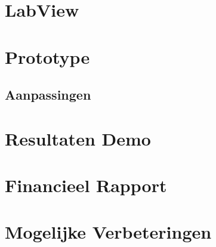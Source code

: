 \documentclass[kulak]{kulakarticle} %
\begin{document}
\section{LabView}



\section{Prototype}


\subsection{Aanpassingen}


\section{Resultaten Demo}





\section{Financieel Rapport}





\section{Mogelijke Verbeteringen}





\end{document}
